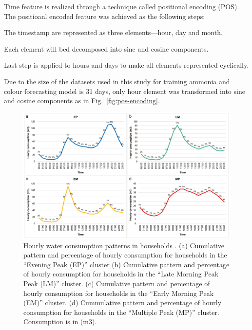 Time feature is realized through a technique called positional encoding (POS). The positioanl encoded feature was achieved as the following steps:

\noindent
\begin{myenumerate}
    \item The timestamp are represented as three elements---hour, day and month.
    \item Each element will bed decomposed into sine and cosine components.
    \item Last step is applied to hours and days to make all elements represented cyclically.
\end{myenumerate}

Due to the size of the datasets used in this study for training ammonia and colour forecasting model is 31 days, only hour element was transformed into sine and cosine components as in Fig.~\ref{fig:pos-encoding}.

\begin{figure}[h]
    \centering
    \includegraphics[width=0.8\columnwidth]{imgs/pre-processing/hourly-consumption-pattern.png}
    \caption{Hourly water consumption patterns in households \citep{abu-bakarQuantifyingImpactCOVID192021}. (a) Cumulative pattern and percentage of hourly consumption for households in the “Evening Peak (EP)” cluster (b) Cumulative pattern and percentage of hourly consumption for households in the “Late Morning Peak Peak (LM)” cluster. (c) Cumulative pattern and percentage of hourly consumption for households in the “Early Morning Peak (EM)” cluster. (d) Cummulative pattern and percentage of hourly consumption for households in the “Multiple Peak (MP)” cluster. Consumption is in (m3).}
    \label{fig:water-consumption-pattern}
 \end{figure}

